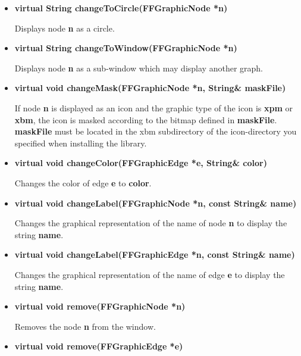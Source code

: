 \begin{itemize}
Displays node {\bf n} as the icon defined in {\bf iconFile}. Supported
graphic types are {\bf gif}, {\bf ppm}, {\bf xbm} and {\bf xpm}. {\bf
iconFile} must be located in the according sub-directory of the icon
directory you specified when installing the library. If e.g. {\bf
iconFile} is name.xxx there must be two files,
ICON\_LIBDIR/xxx/nameN.xxx and ICON\_LIBDIR/xxx/nameS.xxx where
nameN.xxx contains the icon for the node if it is not selected and
nameS.xxx contains the icon for the node if it is selected.

\item{\bf virtual String changeToCircle(FFGraphicNode *n)}

Displays node {\bf n} as a circle.

\item{\bf virtual String changeToWindow(FFGraphicNode *n)}

Displays node {\bf n} as a sub-window which may display another graph.

\item{\bf virtual void changeMask(FFGraphicNode *n, String\& maskFile)}

If node {\bf n} is displayed as an icon and the graphic type of the
icon is {\bf xpm} or {\bf xbm}, the icon is masked according to the
bitmap defined in {\bf maskFile}. {\bf maskFile} must be located in
the xbm subdirectory of the icon-directory you specified when
installing the library.

\item{\bf virtual void changeColor(FFGraphicEdge *e, String\& color)}

Changes the color of edge {\bf e} to {\bf color}.

\item{\bf virtual void changeLabel(FFGraphicNode *n, const 
        String\& name)}

Changes the graphical representation of the name of node {\bf n} to
display the string {\bf name}.

\item{\bf virtual void changeLabel(FFGraphicEdge *n, const 
        String\& name)}

Changes the graphical representation of the name of edge {\bf e} to
display the string {\bf name}.

\item{\bf virtual void remove(FFGraphicNode *n)}

Removes the node {\bf n} from the window.

\item{\bf virtual void remove(FFGraphicEdge *e)}


\end{itemize}
